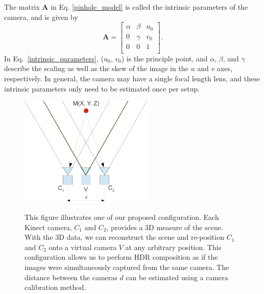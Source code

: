 The matrix $\mathbf{A}$ in Eq. \ref{pinhole_model} is called the intrinsic parameters of the camera, and is given by 
\begin{equation}
\mathbf{A} = 
\begin{bmatrix} 
  \alpha & \beta & u_{0}\\ 
  0 & \gamma & v_{0} \\
  0 & 0 & 1 \\  
\end{bmatrix}.
\label{intrinsic_parameters}
\end{equation} 
In Eq.~\ref{intrinsic_parameters}, ($u_{0}$, $v_{0}$) is the principle point, and $\alpha$, $\beta$, 
and $\gamma$ describe the scaling as well as the skew of the image in the $u$ and $v$ axes, 
respectively. In general, the camera may have a single focal length lens, and these intrinsic 
parameters only need to be estimated once per setup.
\begin{figure}
\centering
\includegraphics[width=2.5in]{ch4/diagrams/multi_virt_cam2.pdf} \\
\caption{This figure illustrates one of our proposed configuration. Each Kinect camera, $C_1$ and 
$C_2$, provides a 3D measure of the scene. With the 3D data, we can reconstruct the scene and 
re-position $C_1$ and $C_2$ onto a virtual camera $V$ at any arbitrary position. This configuration 
allows us to perform HDR composition as if the images were simultaneously captured from the 
same camera. The distance between the cameras $d$ can be estimated using a camera 
calibration method.}
\label{fig_v_camera}
\end{figure}
